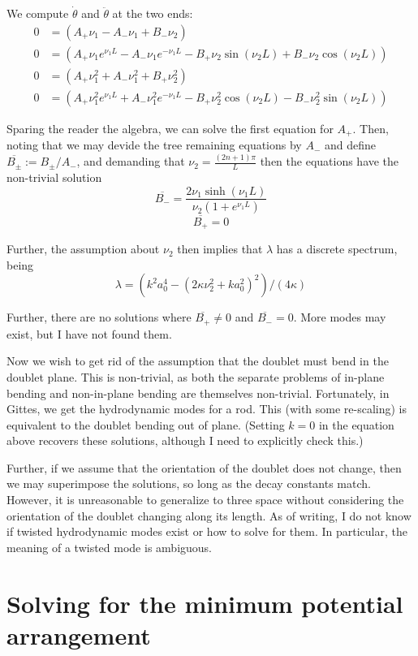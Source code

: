 \documentclass{article}
\theoremstyle{exampstyle} \newtheorem*{remark}{Remark}
\newcommand{\1}{\mathds{1}}
\begin{document}
We compute $\dot\theta$ and $\ddot\theta$ at the two ends:
\begin{align*}
0 &= \left( A_+\nu_1-A_-\nu_1+ B_-\nu_2\right)\\
0 &= \left( A_+\nu_1e^{\nu_1L} -A_-\nu_1e^{-\nu_1L} - B_+\nu_2\sin(\nu_2L) + B_-\nu_2\cos(\nu_2L)\right)\\
0 &= \left( A_+\nu_1^2 + A_-\nu_1^2 + B_+\nu_2^2\right)\\
0 &= \left( A_+\nu_1^2e^{\nu_1L} + A_-\nu_1^2e^{-\nu_1L} - B_+\nu_2^2\cos(\nu_2L) - B_-\nu_2^2\sin(\nu_2L)\right)
\end{align*}


Sparing the reader the algebra, we can solve the first equation for $A_+$. Then, noting that we may devide the tree remaining equations by $A_-$ and define $\overline{B_\pm}:=B_\pm/A_-$, and demanding that $\nu_2=\frac{(2n+1)\pi}{L}$ then the equations have the non-trivial solution
$$ \overline{B_-}=\frac{2\nu_1 \sinh (\nu_1 L)}{\nu_2 (1+e^{\nu_1L})} $$
$$ \overline{B_+}=0 $$

Further, the assumption about $\nu_2$ then implies that $\lambda$ has a discrete spectrum, being
$$ \lambda= (k^2a_0^4-(2\kappa\nu_2^2+ka_0^2)^2 )/(4\kappa) $$

Further, there are no solutions where $ \overline{B_+}\neq0$ and $\overline{B_-}=0$. More modes may exist, but I have not found them.

Now we wish to get rid of the assumption that the doublet must bend in the doublet plane. This is non-trivial, as both the separate problems of in-plane bending and non-in-plane bending are themselves non-trivial. Fortunately, in Gittes, we get the hydrodynamic modes for a rod. This (with some re-scaling) is equivalent to the doublet bending out of plane. (Setting $k=0$ in the equation above recovers these solutions, although I need to explicitly check this.)

Further, if we assume that the orientation of the doublet does not change, then we may superimpose the solutions, so long as the decay constants match. However, it is unreasonable to generalize to three space without considering the orientation of the doublet changing along its length. As of writing, I do not know if twisted hydrodynamic modes exist or how to solve for them. In particular, the meaning of a twisted mode is ambiguous. 


\section{Solving for the minimum potential arrangement}
\end{document}
